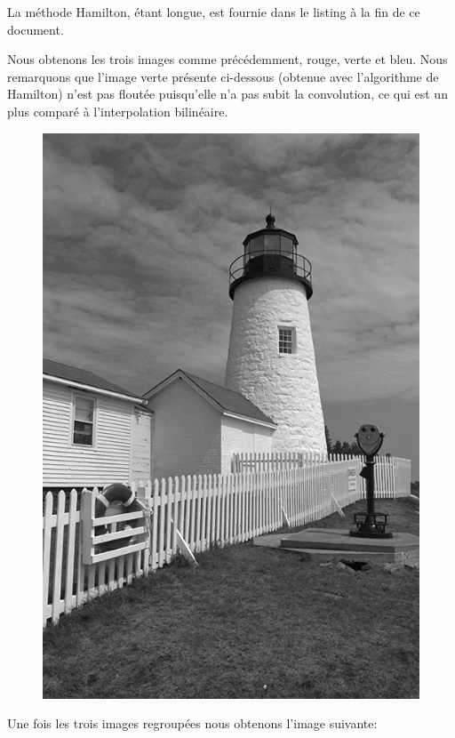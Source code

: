\documentclass[a4paper,12pt]{report}
\begin{document}
La méthode Hamilton, étant longue, est fournie dans le listing à la fin de ce document.

Nous obtenons les trois images comme précédemment, rouge, verte et bleu. Nous remarquons que l'image verte présente ci-dessous (obtenue avec l'algorithme de Hamilton) n'est pas floutée puisqu'elle n'a pas subit la convolution, ce qui est un plus comparé à l'interpolation bilinéaire. 

\begin{figure}[!ht]
	\center
	\includegraphics[scale=0.3]{./image/part3-31Vert.png}
\end{figure}

\newpage

Une fois les trois images regroupées nous obtenons l'image suivante:
\end{document}

